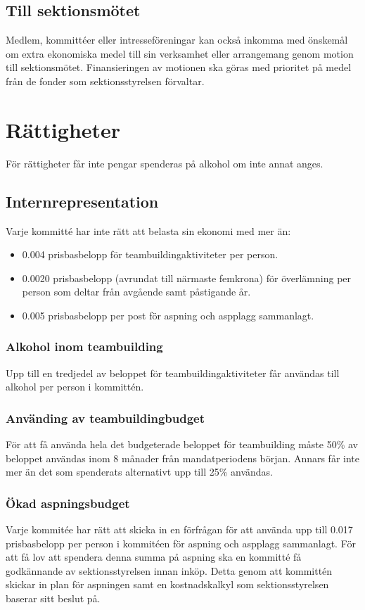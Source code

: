 \documentclass[a4paper]{dtek}
\newcommand{\prisbasbelopp}[1]{
    #1 prisbasbelopp
    \ifdef{\nuvarandeprisbasbelopp}{
        \marginpar{
            \small{ \textbf{\roundandprint{\xintiexpr#1 * \nuvarandeprisbasbelopp\relax}kr}}
        }
    }{}
}
\begin{document}
\subsection{Till sektionsmötet}
Medlem, kommittéer eller intresseföreningar kan också inkomma med önskemål om extra ekonomiska medel till sin verksamhet eller arrangemang genom motion till sektionsmötet. Finansieringen av motionen ska göras med prioritet på medel från de fonder som sektionsstyrelsen förvaltar.

\section{Rättigheter}
För rättigheter får inte pengar spenderas på alkohol om inte annat anges.

\subsection{Internrepresentation}
\label{sec:internreps}
Varje kommitté har inte rätt att belasta sin ekonomi med mer än:
\begin{itemize}
    \item[-] \prisbasbelopp{0.004} för teambuildingaktiviteter per person.
    \item[-] \prisbasbelopp{0.0020} (avrundat till närmaste femkrona) för överlämning per person som deltar från avgående samt påstigande år.
    \item[-] \prisbasbelopp{0.005}  per post för aspning och aspplagg sammanlagt.
\end{itemize}

\subsubsection{Alkohol inom teambuilding}
Upp till en tredjedel av beloppet för teambuildingaktiviteter får användas till alkohol per person i kommittén.

\subsubsection{Använding av teambuildingbudget}
För att få använda hela det budgeterade beloppet för teambuilding måste 50\% av beloppet användas inom 8 månader från mandatperiodens början. Annars får inte mer än det som spenderats alternativt upp till 25\% användas.

\subsubsection{Ökad aspningsbudget}
Varje kommitée har rätt att skicka in en förfrågan för att använda upp till
0.017 prisbasbelopp per person i kommitéen för aspning och aspplagg sammanlagt. För att
få lov att spendera denna summa på aspning ska en kommitté få godkännande av
sektionsstyrelsen innan inköp. Detta genom att kommittén skickar in plan för aspningen samt
en kostnadskalkyl som sektionsstyrelsen baserar sitt beslut på.
\end{document}
